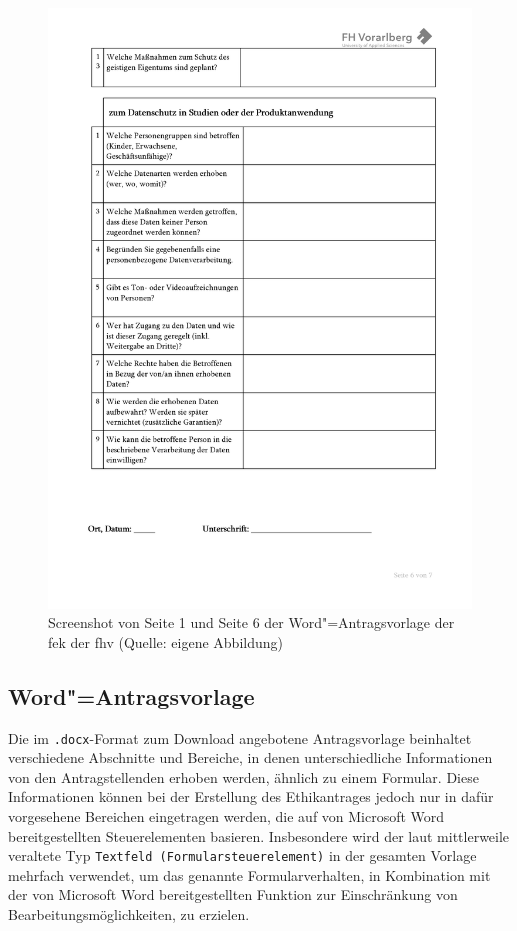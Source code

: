\documentclass[a4paper,12pt,twoside]{scrreprt}
\begin{document}
\begin{figure}[ht]
\begin{minipage}[b]{.49\linewidth}
        \includegraphics[width=\linewidth]{thesis/images/Luidold_Word-Vorlage-FHV-2.png}
    \end{minipage}
    \caption[{Screenshot von Seite 1 und Seite 6 der Word"=Antragsvorlage der \acs{fek} der \acs{fhv}}]{Screenshot von Seite 1 und Seite 6 der Word"=Antragsvorlage der \acs{fek} der \acs{fhv} (Quelle: eigene Abbildung)}
    \label{fig:dokumentenvorlage-fek}
\end{figure}

\subsection{Word"=Antragsvorlage}
\label{sub-sec:word-antragsvorlage}

Die im \texttt{.docx}-Format zum Download angebotene Antragsvorlage beinhaltet verschiedene Abschnitte und Bereiche, in denen unterschiedliche Informationen von den Antragstellenden erhoben werden, ähnlich zu einem Formular. Diese Informationen können bei der Erstellung des Ethikantrages jedoch nur in dafür vorgesehene Bereichen eingetragen werden, die auf von Microsoft Word bereitgestellten Steuerelementen basieren. Insbesondere wird der laut \cite{ay_textfelder_2023} mittlerweile veraltete Typ \texttt{Textfeld (Formularsteuerelement)} in der gesamten Vorlage mehrfach verwendet, um das genannte Formularverhalten, in Kombination mit der von Microsoft Word bereitgestellten Funktion zur Einschränkung von Bearbeitungsmöglichkeiten, zu erzielen.
\end{document}
